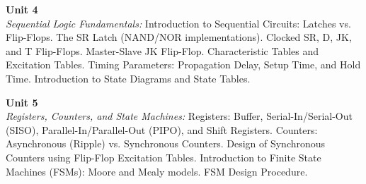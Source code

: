 \noindent\textbf{Unit 4} \\
\textit{Sequential Logic Fundamentals:} Introduction to Sequential Circuits: Latches vs. Flip-Flops. The SR Latch (NAND/NOR implementations). Clocked SR, D, JK, and T Flip-Flops. Master-Slave JK Flip-Flop. Characteristic Tables and Excitation Tables. Timing Parameters: Propagation Delay, Setup Time, and Hold Time. Introduction to State Diagrams and State Tables.

\vspace{0.3cm}

\noindent\textbf{Unit 5} \\
\textit{Registers, Counters, and State Machines:} Registers: Buffer, Serial-In/Serial-Out (SISO), Parallel-In/Parallel-Out (PIPO), and Shift Registers. Counters: Asynchronous (Ripple) vs. Synchronous Counters. Design of Synchronous Counters using Flip-Flop Excitation Tables. Introduction to Finite State Machines (FSMs): Moore and Mealy models. FSM Design Procedure.

\newpage
{}